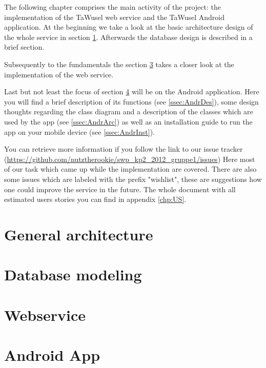 
The following chapter comprises the main activity of the project: the implementation of the TaWusel web service and the TaWusel
Android application. At the beginning we take a look at the basic architecture design of the whole service in section
\ref{sec:GArc}. Afterwards the database design is described in a brief section.

\emptyRow
Subsequently to the fundamentals the section \ref{sec:Webs} takes a closer look at the implementation of the web service.

\emptyRow
Last but not least the focus of section \ref{sec:Andr} will be on the Android application. Here you will find a brief description
of its functions (see \ref{ssec:AndrDes}), some design thoughts regarding the class diagram and a description of the classes which
are used by the app (see \ref{ssec:AndrArc}) as well as an installation guide to run the app on your mobile device (see
\ref{ssec:AndrInst}). 

\emptyRow
You can retrieve more information if you follow the link to our issue tracker
(\url{https://github.com/nutztherookie/swp_kp2_2012_gruppe1/issues}) Here most of our task which came up while the implementation
are covered. There are also some issues which are labeled with the prefix "wishlist", these are suggestions how one could improve
the service in the future. The whole document with all estimated users stories you can find in appendix \ref{chp:US}.

\clearpage

\section{General architecture}\label{sec:GArc}


\clearpage
\section{Database modeling}


\clearpage
\section{Webservice}\label{sec:Webs}


\clearpage
\section{Android App}\label{sec:Andr}


